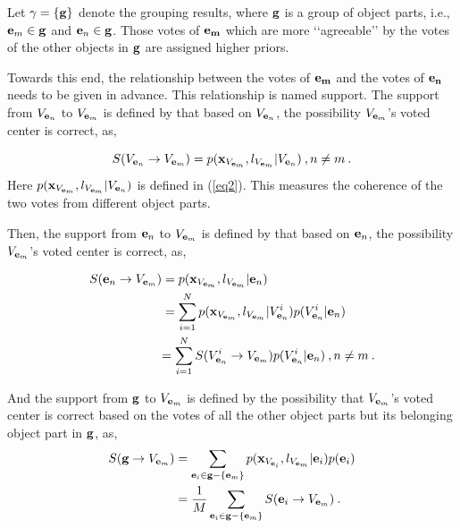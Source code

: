 \documentclass[10pt,twocolumn,letterpaper]{article}
\begin{document}
Let $\gamma=\{\bf{g}\}$ denote the grouping results, where $\bf{g}$ is a group of object parts, i.e., ${{\bf{e}}_m}\in \bf{g}$ and ${{\bf{e}}_n}\in \bf{g}$. Those votes of ${\bf{e}_m}$ which are more {\lq\lq}agreeable{\rq\rq} by the votes of the other objects in $\bf{g}$ are assigned higher priors.

Towards this end, the relationship between the votes of $\bf{e}_m$ and the votes of $\bf{e}_n$ needs to be given in advance. This relationship is named support. The support from ${V_{{{\bf{e}}_n}}}$ to ${V_{{{\bf{e}}_m}}}$ is defined by that based on ${V_{{{\bf{e}}_n}}}$, the possibility ${V_{{{\bf{e}}_m}}}$'s voted center is correct, as,


\[
S({V_{{{\bf{e}}_n}}} \to {V_{{{\bf{e}}_m}}})  =  p({\bf{x}}_{V_{{{\bf{e}}_m}}},l_{V_{{{\bf{e}}_m}}}|{V_{{{\bf{e}}_n}}})\:,n \ne m\:.
\]
Here $p({\bf{x}}_{V_{{{\bf{e}}_m}}},l_{V_{{{\bf{e}}_m}}}|{V_{{{\bf{e}}_n}}})$ is defined in (\ref{eq2}). This measures the coherence of the two votes from different object parts.

Then, the support from ${{\bf{e}}_n}$ to ${V_{{{\bf{e}}_m}}}$ is defined by that based on ${{\bf{e}}_n}$, the possibility $V_{{{\bf{e}}_m}}$'s voted center is correct, as,

\[
\begin{aligned}
S({{{\bf{e}}_n} \to {V_{{{\bf{e}}_m}}}}) &= p({\bf{x}}_{V_{{{\bf{e}}_m}}},l_{V_{{{\bf{e}}_m}}}|{{{\bf{e}}_n}})\\
&=\sum\limits^N_{i=1} {p({\bf{x}}_{V_{{{\bf{e}}_m}}},l_{V_{{{\bf{e}}_m}}}|{V^i_{{{\bf{e}}_n}}})p(V^i_{{\bf{e}}_n}|{\bf{e}}_n)}\\
& {
=\sum\limits^N_{i=1} {S({{V^i_{{{\bf{e}}_n}}} \to {V_{{{\bf{e}}_m}}}})p(V^i_{{\bf{e}}_n}|{\bf{e}}_n)}\:,n \ne m\:.
}
\end{aligned}
\]

And the support from ${\bf{g}}$ to $V_{{\bf{e}}_m}$ is defined by the possibility that $V_{{\bf{e}}_m}$'s voted center is correct based on the votes of all the other object parts but its belonging object part in $\bf{g}$, as,
\[
\begin{aligned}
S({\bf{g}} \to V_{{\bf{e}}_m})
&= \sum\limits_{{{\bf{e}}_i} \in {\bf{g}}- \{ {{\bf{e}}_m} \} }{p({\bf{x}}_{V_{{{\bf{e}}_i}}},l_{V_{{{\bf{e}}_m}}}|{{{\bf{e}}_i}})p({{\bf{e}}_i})}\\
& =\frac 1 M  \sum\limits_{{{\bf{e}}_i} \in {\bf{g}}- \{ {{\bf{e}}_m} \}} {S({{{\bf{e}}_i} \to {V_{{{\bf{e}}_m}}}})} \:.
\end{aligned}
\]
\end{document}
